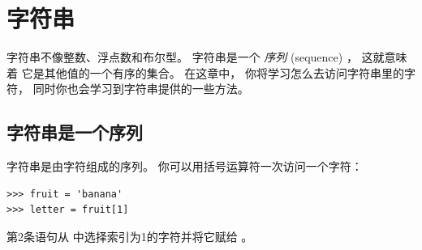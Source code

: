 

\chapter{字符串}
\label{strings}


字符串不像整数、浮点数和布尔型。  字符串是一个 {\em 序列} (sequence) ， 这就意味着
它是其他值的一个有序的集合。  在这章中， 你将学习怎么去访问字符串里的字符， 同时你也会学习到字符串提供的一些方法。
  

\section{字符串是一个序列}

  
  
  
  




字符串是由字符组成的序列。  你可以用括号运算符一次访问一个字符：

\begin{lstlisting}
>>> fruit = 'banana'
>>> letter = fruit[1]
\end{lstlisting}

%

第2条语句从  中选择索引为1的字符并将它赋给  。


